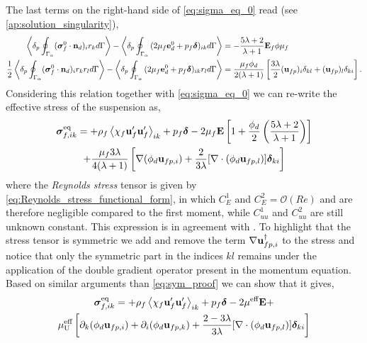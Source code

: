 The last terms on the right-hand side of \ref{eq:sigma_eq_0} read (see \ref{ap:solution_singularity}), 
\begin{align*}
    \left<\delta_p \oint_{\Gamma_{\alpha}} (\bm{\sigma}_f^0 \cdot \textbf{n}_d)_ir_k d\Gamma\right> -
    \left<\delta_p \oint_{\Gamma_{\alpha}} {(2 \mu_f \textbf{e}_d^0+ p_f\bm\delta)_{ik}} d\Gamma\right> 
    &= 
    - \frac{5\lambda +2}{\lambda +1}
    \textbf{E}_f \phi \mu_f
    \\
    \frac{1}{2}\left<\delta_p \oint_{\Gamma_{\alpha}} (\bm{\sigma}_f^0 \cdot \textbf{n}_d)_ir_kr_l d\Gamma\right> -
    \left<\delta_p \oint_{\Gamma_{\alpha}} {(2 \mu_f \textbf{e}_d^0+ p_f\bm\delta)_{ik} r_l} d\Gamma\right> 
    &= 
    \frac{\mu_f\phi_d}{2(\lambda +1) }
    \left[
        \frac{3\lambda}{2} 
        (\textbf{u}_{fp})_i\delta_{kl}
        +  (\textbf{u}_{fp})_l\delta_{ki}
    \right]. 
\end{align*}
Considering this relation together with \ref{eq:sigma_eq_0} we can re-write the effective stress of the suspension as, 
\begin{multline}
    \bm{\sigma}^\text{eq}_{f,ik} =
    + \rho_f\left<\chi_f\textbf{u}_f'\textbf{u}_f'\right>_{ik} 
    + p_f \bm\delta
    - 2 \mu_f \textbf{E}\left[
        1
        +\frac{\phi_d}{2}\left(
            \frac{5\lambda +2}{\lambda +1}
        \right)
    \right]\\
    + 
    \frac{\mu_f 3\lambda}{4(\lambda +1) }
    \left[
        \mathbf{\nabla} (\phi_d\textbf{u}_{fp,i})
        +  
        \frac{2}{3\lambda} 
        [\mathbf{\nabla}\cdot (\phi_d\textbf{u}_{fp,l})]\bm\delta_{ki}
    \right]
\end{multline} 
where the \textit{Reynolds stress} tensor is given by \ref{eq:Reynolds_stress_functional_form}, in which $C_E^1$ and $C_E^2 = \mathcal{O}(Re)$ and are therefore negligible compared to the first moment, while $C_{uu}^1$ and $C_{uu}^2$ are still unknown constant. 
This expression is in agreement with \citet[Appendix A]{zhang1997momentum}. 
To highlight that the stress tensor is symmetric we add and remove the term $ \mathbf{\nabla} \textbf{u}_{fp,i}^\dagger$  to the stress and notice that only the symmetric part in the indices $kl$ remains under the application of the double gradient operator present in the momentum equation. 
Based on similar arguments than \ref{eq:sym_proof} we can show that it gives, 
\begin{multline}
    \bm{\sigma}^\text{eq}_{f,ik} =
    + \rho_f\avg{\chi_f\textbf{u}_f'\textbf{u}_f'}_{ik} 
    + p_f \bm\delta
    - 2\mu^\text{eff} \textbf{E}
    + \\
    \mu_\text{U}^\text{eff}
    \left[
        \partial_k   (\phi_d\textbf{u}_{fp,i})
        + \partial_i (\phi_d\textbf{u}_{fp,k})
        + \frac{2-3\lambda}{3\lambda}  [\div (\phi_d\textbf{u}_{fp,l})]\bm\delta_{ki}
    \right]
    \label{eq:fluid_phase_stress}
\end{multline} 

